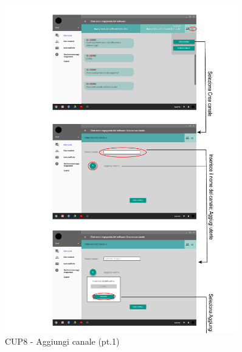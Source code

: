 \begin{figure}
	\centering
	\includegraphics[width=0.9\textwidth]{imgs/gruppo6/activities/act_cup8_aggiungi_canale1.pdf}
	\caption{CUP8 - Aggiungi canale (pt.1)}
	\label{fig:act-cup8}
\end{figure}

